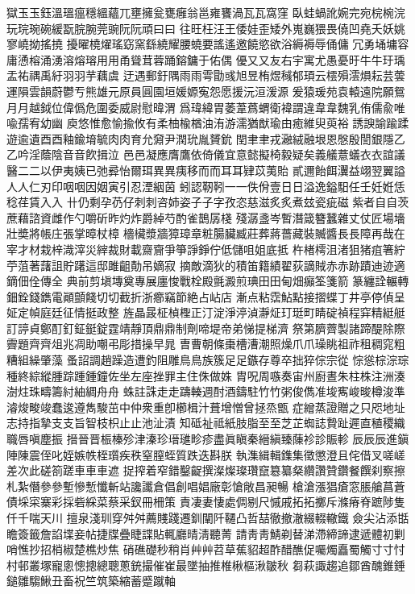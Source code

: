 獄⽟玉鈺溫瑥瘟穩縕蘊兀壅擁瓮甕癰翁邕雍饔渦⽡瓦窩窪
臥蛙蝸訛婉完宛梡椀浣玩琓琬碗緩翫脘腕莞豌阮阮頑⽈曰
往旺枉汪王倭娃歪矮外嵬巍猥畏僥凹堯夭妖姚寥嶢拗搖撓
擾曜橈燿瑤窈窯繇繞耀腰蟯要謠遙邀饒慾欲浴縟褥辱俑傭
冗勇埇墉容庸慂榕涌湧溶熔瑢⽤用甬聳茸蓉踊鎔鏞于佑偶
優⼜又友右宇寓尤愚憂旴⽜牛玗瑀盂祐禑禹紆⽻羽芋藕虞
迂遇郵釪隅⾬雨雩勖彧旭昱栯煜稶郁頊云橒殞澐熉耘芸蕓
運隕雲韻蔚鬱亐熊雄元原員圓園垣媛嫄寃怨愿援沅洹湲源
爰猿瑗苑袁轅遠院願鴛⽉月越鉞位偉僞危圍委威尉慰暐渭
爲瑋緯胃萎葦蔿蝟衛褘謂違⾱韋魏乳侑儒兪唯喩孺宥幼幽
庾悠惟愈愉揄攸有柔柚楡楢油洧游濡猶猷瑜由癒維臾萸裕
誘諛諭踰蹂遊逾遺⾣酉釉鍮堉毓⾁肉育允奫尹潤玧胤贇鈗
閏⾀聿戎瀜絨融垠恩慇殷誾銀隱⼄乙吟淫蔭陰⾳音飮揖泣
⾢邑凝應膺鷹依倚儀宜意懿擬椅毅疑矣義艤薏蟻⾐衣誼議
醫⼆二以伊夷姨已弛彛怡爾珥異異痍移⽽而⽿耳肄苡荑貽
貳邇飴餌瀷益翊翌翼謚⼈人仁刃印咽咽因姻寅引忍湮絪茵
蚓認靭靷⼀一佚佾壹⽇日溢逸鎰馹任壬妊姙恁稔荏賃⼊入
卄仍剩孕芿仔刺刺咨姉姿⼦子字孜恣慈滋炙炙煮玆瓷疵磁
紫者⾃自茨蔗藉諮資雌作勺嚼斫昨灼炸爵綽芍酌雀鵲孱棧
殘潺盞岑暫潛箴簪蠶雜丈仗匠場墻壯奬將帳庄張掌暲杖樟
檣欌漿牆獐璋章粧腸臟臧莊葬蔣薔藏裝贓醬⾧長障再哉在
宰才材栽梓渽滓災縡裁財載齋齎爭箏諍錚佇低儲咀姐底抵
杵楮樗沮渚狙猪疽箸紵苧菹著藷詛貯躇這邸雎齟勣吊嫡寂
摘敵滴狄的積笛籍績翟荻謫賊⾚赤跡蹟迪迹適鏑佃佺傳全
典前剪塡塼奠專展廛悛戰栓殿氈澱煎琠⽥田甸畑癲筌箋箭
篆纏詮輾轉鈿銓錢鐫電顚顫餞切切截折浙癤竊節絶占岾店
漸点粘霑鮎點接摺蝶丁井亭停偵呈姃定幀庭廷征情挺政整
旌晶晸柾楨檉正汀淀淨渟湞瀞炡玎珽町睛碇禎程穽精綎艇
訂諪貞鄭酊釘鉦鋌錠霆靖靜頂⿍鼎制劑啼堤帝弟悌提梯濟
祭第臍薺製諸蹄醍除際霽題⿑齊俎兆凋助嘲弔彫措操早晁
曺曹朝條棗槽漕潮照燥⽖爪璪眺祖祚租稠窕粗糟組繰肇藻
蚤詔調趙躁造遭釣阻雕⿃鳥族簇⾜足鏃存尊卒拙猝倧宗從
悰慫棕淙琮種終綜縱腫踪踵鍾鐘佐坐左座挫罪主住侏做姝
胄呪周嗾奏宙州廚晝朱柱株注洲湊澍炷珠疇籌紂紬綢⾈舟
蛛註誅⾛走躊輳週酎酒鑄駐⽵竹粥俊儁准埈寯峻晙樽浚準
濬焌畯竣蠢逡遵雋駿茁中仲衆重卽櫛楫汁葺增憎曾拯烝甑
症繒蒸證贈之只咫地址志持指摯⽀支旨智枝枳⽌止池沚漬
知砥祉祗紙肢脂⾄至芝芷蜘誌贄趾遲直稙稷織職唇嗔塵振
搢晉晋桭榛殄津溱珍瑨璡畛疹盡眞瞋秦縉縝臻蔯袗診賑軫
⾠辰辰進鎭陣陳震侄叱姪嫉帙桎瓆疾秩窒膣蛭質跌迭斟朕
執潗緝輯鏶集徵懲澄且侘借叉嗟嵯差次此磋箚蹉⾞車車遮
捉搾着窄錯鑿齪撰澯燦璨瓚竄簒纂粲纘讚贊鑽餐饌刹察擦
札紮僭參參塹慘慙懺斬站讒讖倉倡創唱娼廠彰愴敞昌昶暢
槍滄漲猖瘡窓脹艙菖蒼債埰寀寨彩採砦綵菜蔡采釵冊柵策
責凄妻悽處倜剔尺慽戚拓拓擲斥滌瘠脊蹠陟隻仟千喘天川
擅泉淺玔穿⾇舛薦賤踐遷釧闡阡韆凸哲喆徹撤澈綴輟轍鐵
僉尖沾添甛瞻簽籤詹諂堞妾帖捷牒疊睫諜貼輒廳晴淸聽菁
請⾭靑鯖剃替涕滯締諦逮遞體初剿哨憔抄招梢椒楚樵炒焦
硝礁礎秒稍肖⾋艸苕草蕉貂超酢醋醮促囑燭矗蜀觸⼨寸忖
村邨叢塚寵悤憁摠總聰蔥銃撮催崔最墜抽推椎楸樞湫皺秋
芻萩諏趨追鄒酋醜錐錘鎚雛騶鰍丑畜祝竺筑築縮蓄蹙蹴軸
